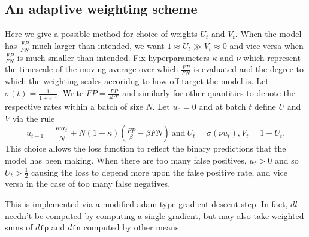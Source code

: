 \documentclass[10pt,a4paper]{article}
\begin{document}
\subsection{An adaptive weighting scheme}
Here we give a possible method for choice of weights $U_t$ and $V_t$.
When the model has $\tfrac{FP}{FN}$ much larger than intended, we want $1\approx U_t\gg V_t\approx0$ and vice versa when $\tfrac{FP}{FN}$ is much smaller than intended.
Fix hyperparameters $\kappa$ and $\nu$ which represent the timescale of the moving average over which $\tfrac{FP}{FN}$ is evaluated and the degree to which the weighting scales accoridng to how off-target the model is.
Let $\sigma(t)=\tfrac1{1+e^{-t}}$.
Write $\widetilde{FP}=\tfrac{FP}{\#\mathcal F}$ and similarly for other quantities to denote the respective rates within a batch of size $N$.
Let $u_0=0$ and at batch $t$ define $U$ and $V$ via the rule
$$
u_{t+1}=\frac{\kappa u_t}N+N(1-\kappa)(\tfrac{\widetilde{FP}}\beta-\beta\widetilde{FN})~\text{and}~U_t=\sigma(\nu u_t),V_t=1-U_t.
$$
This choice allows the loss function to reflect the binary predictions that the model has been making.
When there are too many false positives, $u_t>0$ and so $U_t>\tfrac12$ causing the loss to depend more upon the false positive rate, and vice versa in the case of too many false negatives.

This is implemented via a modified adam type gradient descent step.
In fact, $dl$ needn't be computed by computing a single gradient, but may also take weighted sums of $d\texttt{fp}$ and $d\texttt{fn}$ computed by other means.



\end{document}
